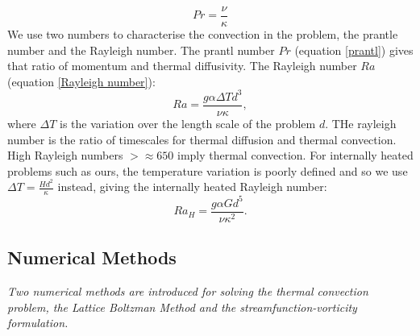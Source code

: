\documentclass{article}
\begin{document}
\begin{equation}
	Pr = \frac{\nu}{\kappa}
	\label{prantl}
\end{equation}
We use two numbers to characterise the convection in the problem, the prantle number and the Rayleigh number. The prantl number $Pr$ (equation \ref{prantl}) gives that ratio of momentum and thermal diffusivity. The Rayleigh number $Ra$ (equation \ref{Rayleigh number}):
\begin{equation}
	Ra = \frac{g \alpha \Delta T  d^3}{\nu \kappa},
\end{equation}
where $\Delta T$ is the variation over the length scale of the problem $d$. THe rayleigh number is the ratio of timescales for thermal diffusion and thermal convection. High Rayleigh numbers $>\approx 650$ imply thermal convection. For internally heated problems such as ours, the temperature variation is poorly defined and so we use $\Delta T = \frac{H d^2}{\kappa}$ instead, giving the internally heated Rayleigh number:
\begin{equation}
	Ra_{H} = \frac{g \alpha G d^5}{\nu {\kappa}^2}.
\end{equation}


\subsection*{Numerical Methods}

{\it{Two numerical methods are introduced for solving the thermal convection problem, the Lattice Boltzman Method and the streamfunction-vorticity formulation. }}
\end{document}
